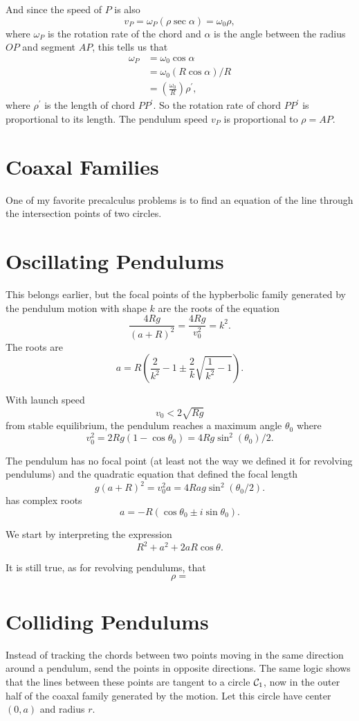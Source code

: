 \documentclass{ximera}
\begin{document}
And since the speed of $P$ is also
\[
  v_P = \omega_P (\rho \sec\alpha)  = \omega_0 \rho , 
\]
where $\omega_P$ is the rotation rate of the chord and $\alpha$ is the angle between the radius $OP$ and segment $AP$, this tells us that
\begin{align*}
\omega_P &= \omega_0  \cos  \alpha  \\
                &= \omega_0 (R\cos \alpha) / R \\
                & = \left( \frac{\omega_0}{R} \right) \rho^\prime ,
\end{align*}
where $\rho^\prime$ is the length of chord $PP^\prime$. So the rotation rate of chord $PP^\prime$ is proportional to its length. The pendulum speed $v_P$ is proportional to $\rho = AP$.


\section{Coaxal Families}
One of my favorite precalculus problems is to find an equation of the line through the intersection points of two circles.


\section{Oscillating Pendulums}
This belongs earlier, but the focal points of the hypberbolic family generated by the pendulum motion with shape $k$ are the roots of the equation
\[
      \frac{4Rg}{(a+R)^2} = \frac{4Rg}{v_0^2} = k^2.
\]
The roots are
\[
      a = R \left(\frac{2}{k^2} -1  \pm \frac{2}{k}\sqrt{\frac{1}{k^2}-1} \right) . 
\]

With launch speed
\[
   v_0 < 2\sqrt{Rg}
\]
from stable equilibrium, the pendulum reaches a maximum angle $\theta_0$ where 
\[
    v_0^2 = 2Rg(1-\cos\theta_0) = 4Rg\sin^2 (\theta_0)/2 .
\]

The pendulum has no focal point (at least not the way we defined it for revolving pendulums) and the quadratic equation that defined the focal length 
\[
     g(a+R)^2 = v_0^2 a = 4Rag\sin^2 (\theta_0/2) .
\]
has complex roots
\[
     a = -R(\cos \theta_0 \pm i \sin \theta_0).
\]

We start by interpreting the expression
\[
       R^2 + a^2 + 2aR\cos\theta.
\]


It is still true, as for revolving pendulums, that
\[
  \rho = 
\]


\section*{Colliding Pendulums}
Instead of tracking the chords between two points moving in the same direction around a pendulum, send the points in opposite directions. The same logic shows that the lines between these points are tangent to a circle ${\cal C}_1$, now  in the outer half of the coaxal family generated by the motion. Let this circle have center $(0,a)$ and radius $r$.
\end{document}
